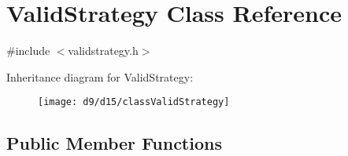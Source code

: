 \hypertarget{classValidStrategy}{\section{\-Valid\-Strategy \-Class \-Reference}
\label{d9/d15/classValidStrategy}
}


{\ttfamily \#include $<$validstrategy.\-h$>$}

\-Inheritance diagram for \-Valid\-Strategy\-:\begin{figure}[H]
\begin{center}
\leavevmode
\texttt{[image: d9/d15/classValidStrategy]}
\end{center}
\end{figure}
\subsection*{\-Public \-Member \-Functions}
